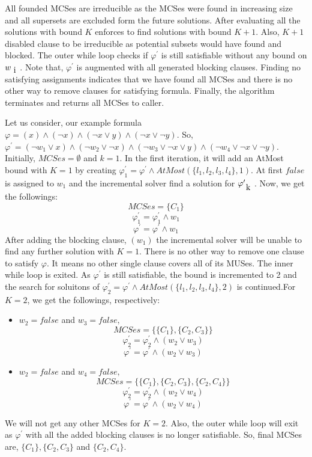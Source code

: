All founded MCSes are irreducible as the MCSes were found in increasing size and all supersets are excluded form the future solutions. After evaluating all the solutions with bound $K$ enforces to find solutions with bound $K+1$. Also, $K+1$ disabled clause to be irreducible as potential subsets would have found and blocked.\newline
The outer while loop checks if $\varphi^{\prime}$ is still satisfiable without any bound on $w_{\text i}$. Note that, $\varphi^{\prime}$ is augmented with all  generated blocking clauses. Finding no satisfying assignments indicates that we have found all MCSes and there is no other way to remove clauses for satisfying formula. Finally, the algorithm terminates and returns all MCSes to caller.\newline
\begin{example}
Let us consider, our example formula $\varphi=(x)\wedge(\neg x)\wedge(\neg x\vee y)\wedge(\neg x \vee \neg y)$. So, $\varphi^{\prime}=(\neg w_{1}\vee x)\wedge(\neg w_{2}\vee \neg x)\wedge(\neg w_{3}\vee \neg x\vee y)\wedge(\neg w_{4}\vee \neg x \vee \neg y)$. Initially, $MCSes=\emptyset$ and $k=1$.\newline
In the first iteration, it will add an AtMost bound with $K=1$ by creating $\varphi^{\prime}_{1}=\varphi^{\prime} \wedge AtMost(\{l_{1},l_{2},l_{3},l_{4}\},1)$. At first $false$ is assigned to $w_{1}$ and the incremental solver find a solution for $\varphi^{\prime}_{\text k}$. Now, we get the followings:
$$MCSes=\{C_{1}\}$$
$$\varphi^{\prime}_{1}=\varphi^{\prime}_{1} \wedge w_{1}$$
$$\varphi^{\prime}=\varphi^{\prime} \wedge w_{1}$$
After adding the blocking clause, $(w_{1})$ the incremental solver will be unable to find any further solution with $K=1$. There is no other way to remove one clause to satisfy $\varphi$. It means no other single clause covers all of its MUSes. The inner while loop is exited.\newline
As $\varphi^{\prime}$ is still satisfiable, the bound is incremented to 2 and the search for soluitons of $\varphi^{\prime}_{2}=\varphi^{\prime} \wedge AtMost(\{l_{1},l_{2},l_{3},l_{4}\},2)$ is continued.For $K=2$, we get the followings, respectively:
\begin{itemize}
	\item $w_{2}=false$ and $w_{3}=false,$
	$$MCSes=\{\{C_{1}\}, \{C_{2}, C_{3}\}\}$$
	$$\varphi^{\prime}_{2}=\varphi^{\prime}_{2} \wedge (w_{2}\vee w_{3})$$
	$$\varphi^{\prime}=\varphi^{\prime} \wedge (w_{2}\vee w_{3})$$
	\item $w_{2}=false$ and $w_{4}=false,$
	$$MCSes=\{\{C_{1}\}, \{C_{2}, C_{3}\}, \{C_{2}, C_{4}\}\}$$
	$$\varphi^{\prime}_{2}=\varphi^{\prime}_{2} \wedge (w_{2}\vee w_{4})$$
	$$\varphi^{\prime}=\varphi^{\prime} \wedge (w_{2}\vee w_{4})$$
\end{itemize}
We will not get any other MCSes for $K=2$. Also, the outer while loop will exit as $\varphi^{\prime}$ with all the added blocking clauses is no longer satisfiable. So, final MCSes are, $\{C_{1}\}, \{C_{2}, C_{3}\}$ and $\{C_{2}, C_{4}\}$.
\end{example}


